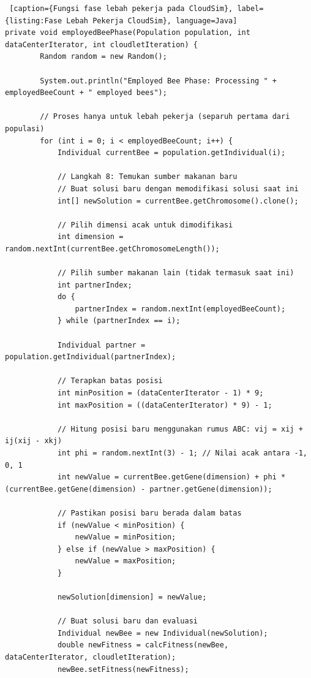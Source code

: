 \begin{lstlisting} [caption={Fungsi fase lebah pekerja pada CloudSim}, label={listing:Fase Lebah Pekerja CloudSim}, language=Java]
private void employedBeePhase(Population population, int dataCenterIterator, int cloudletIteration) {
        Random random = new Random();
        
        System.out.println("Employed Bee Phase: Processing " + employedBeeCount + " employed bees");
        
        // Proses hanya untuk lebah pekerja (separuh pertama dari populasi)
        for (int i = 0; i < employedBeeCount; i++) {
            Individual currentBee = population.getIndividual(i);
            
            // Langkah 8: Temukan sumber makanan baru
            // Buat solusi baru dengan memodifikasi solusi saat ini
            int[] newSolution = currentBee.getChromosome().clone();
            
            // Pilih dimensi acak untuk dimodifikasi
            int dimension = random.nextInt(currentBee.getChromosomeLength());
            
            // Pilih sumber makanan lain (tidak termasuk saat ini)
            int partnerIndex;
            do {
                partnerIndex = random.nextInt(employedBeeCount);
            } while (partnerIndex == i);
            
            Individual partner = population.getIndividual(partnerIndex);
            
            // Terapkan batas posisi
            int minPosition = (dataCenterIterator - 1) * 9;
            int maxPosition = ((dataCenterIterator) * 9) - 1;
            
            // Hitung posisi baru menggunakan rumus ABC: vij = xij + ij(xij - xkj)
            int phi = random.nextInt(3) - 1; // Nilai acak antara -1, 0, 1
            int newValue = currentBee.getGene(dimension) + phi * (currentBee.getGene(dimension) - partner.getGene(dimension));
            
            // Pastikan posisi baru berada dalam batas
            if (newValue < minPosition) {
                newValue = minPosition;
            } else if (newValue > maxPosition) {
                newValue = maxPosition;
            }
            
            newSolution[dimension] = newValue;
            
            // Buat solusi baru dan evaluasi
            Individual newBee = new Individual(newSolution);
            double newFitness = calcFitness(newBee, dataCenterIterator, cloudletIteration);
            newBee.setFitness(newFitness);
            

\end{lstlisting}
